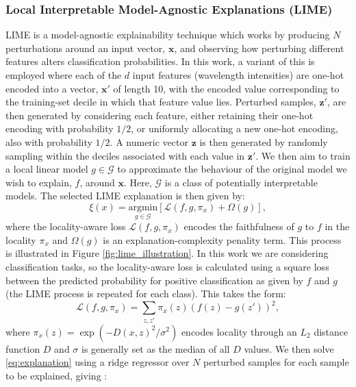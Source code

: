 \subsubsection{Local Interpretable Model-Agnostic Explanations (LIME)}
LIME \cite{ribeiro_why_2016} is a model-agnostic explainability technique which works by producing $N$ perturbations around an input vector, $\boldsymbol{x}$, and observing how perturbing different features alters classification probabilities. In this work, a variant of this is employed where each of the $d$ input features (wavelength intensities) are one-hot encoded \cite{samuels_one-hot_2024} into a vector, $\boldsymbol{x'}$ of length 10, with the encoded value corresponding to the training-set decile in which that feature value lies. Perturbed samples, $\boldsymbol{z'}$, are then generated by considering each feature, either retaining their one-hot encoding with probability $1/2$, or uniformly allocating a new one-hot encoding, also with probability $1/2$. A numeric vector $\boldsymbol{z}$ is then generated by randomly sampling within the deciles associated with each value in $\boldsymbol{z'}$. We then aim to train a local linear model $g\in \mathcal G$ to approximate the behaviour of the original model we wish to explain, $f$, around $\boldsymbol{x}$. Here, $\mathcal G$ is a class of potentially interpretable models. The selected LIME explanation is then given by:
\begin{equation}
    \xi(x)=\underset{g\in \mathcal G}{\text{argmin}} \left[ \mathcal L(f,g,\pi_x)+\Omega(g)\right],
    \label{eq:explanation}
\end{equation}
where the locality-aware loss $\mathcal L(f,g,\pi_x)$ encodes the faithfulness of $g$ to $f$ in the locality $\pi_x$ and $\Omega(g)$ is an explanation-complexity penality term. This process is illustrated in Figure \ref{fig:lime_illustration}. In this work we are considering classification tasks, so the locality-aware loss is calculated using a square loss between the predicted probability for positive classification as given by $f$ and $g$ (the LIME process is repeated for each class). This takes the form:
\begin{equation}
    \mathcal L(f,g,\pi_x)=\sum_{z, z'}\pi_x(z)\left(f(z)-g(z')\right)^2,
\end{equation}
where $\pi_x(z)=\exp(-D(x,z)^2/\sigma^2)$ encodes locality through an $L_2$ \cite{shan_targeted_2019,ribeiro_why_2016} distance function $D$ and $\sigma$ is generally set as the median of all $D$ values. We then solve \ref{eq:explanation} using a ridge regressor over $N$ perturbed samples for each sample to be explained, giving \cite{ribeiro_why_2016}: 
